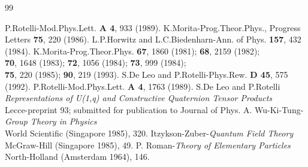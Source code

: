 \begin{thebibliography}{99}

P.Rotelli-Mod.Phys.Lett. {\bf A 4}, 933 (1989).
K.Morita-Prog.Theor.Phys., Progress Letters {\bf 75}, 220 (1986).
L.P.Horwitz and L.C.Biedenharn-Ann. of Phys. {\bf 157}, 432 (1984).
K.Morita-Prog.Theor.Phys. {\bf 67}, 1860 (1981); {\bf 68}, 2159 (1982);\\
{\bf 70}, 1648 (1983); {\bf 72}, 1056 (1984); {\bf 73}, 999 (1984);\\
{\bf 75}, 220 (1985); {\bf 90}, 219 (1993).
S.De Leo and P.Rotelli-Phys.Rew. {\bf D 45}, 575 (1992).
P.Rotelli-Mod.Phys.Lett. {\bf A 4}, 1763 (1989).
S.De Leo and P.Rotelli\\{\em Representations of U(1,q)
and Constructive Quaternion Tensor Products}\\
Lecce-preprint 93; submitted for publication to Journal of Phys. A.
Wu-Ki-Tung-{\em Group Theory in Physics}\\
World Scientific (Singapore 1985), 320.
Itzykson-Zuber-{\em Quantum Field Theory}\\
McGraw-Hill (Singapore 1985), 49.
P. Roman-{\em Theory of Elementary Particles}\\
North-Holland (Amsterdam 1964), 146.
\end{thebibliography}



